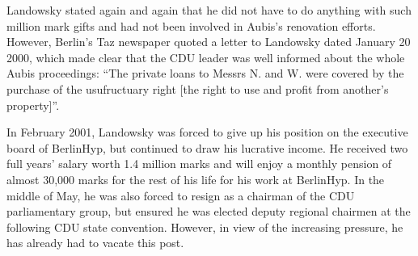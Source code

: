 \documentclass[PRMIA4A.tex]{subfiles}
\begin{document}
Landowsky stated again and again that he did not have to do anything with such million mark gifts and had not been involved in Aubis’s renovation efforts. However, Berlin’s Taz newspaper quoted a letter to Landowsky dated January 20 2000, which made clear that the CDU leader was well informed about the whole Aubis proceedings: “The private loans to Messrs N. and W. were covered by the purchase of the usufructuary right [the right to use and profit from another’s property]”.

In February 2001, Landowsky was forced to give up his position on the executive board of BerlinHyp, but continued to draw his lucrative income. He received two full years’ salary worth 1.4 million marks and will enjoy a monthly pension of almost 30,000 marks for the rest of his life for his work at BerlinHyp. In the middle of May, he was also forced to resign as a chairman of the CDU parliamentary group, but ensured he was elected deputy regional chairmen at the following CDU state convention. However, in view of the increasing pressure, he has already had to vacate this post.


\end{document}
